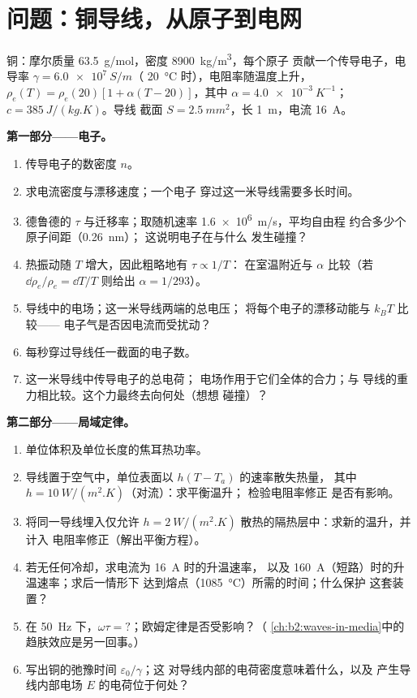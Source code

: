 \section{问题：铜导线，从原子到电网}

\begin{problem}
\label{pb:b2:charges-currents-conduction:1}

铜：摩尔质量 \qty{63.5}{g/mol}，密度 \qty{8900}{kg/m^3}，每个原子
贡献一个传导电子，电导率 $\gamma = \qty{6.0e7}{S/m}$（
\qty{20}{\degreeCelsius} 时），电阻率随温度上升，$\rho_e(T) = \rho_e(20)[1 +
\alpha(T - 20)]$，其中 $\alpha = \qty{4.0e-3}{K^{-1}}$；$c = \qty{385}{J/(kg.K)}$。导线
截面 $S = \qty{2.5}{mm^2}$，长 \qty{1}{m}，电流 \qty{16}{A}。

\medskip
\noindent\textbf{第一部分——电子。}
\begin{enumerate}
  \item 传导电子的数密度 $n$。
  \item 求电流密度与漂移速度；一个电子
        穿过这一米导线需要多长时间。
  \item 德鲁德的 $\tau$ 与迁移率；取随机速率 \qty{1.6e6}{m/s}，平均自由程
        约合多少个原子间距（\qty{0.26}{nm}）；
        这说明电子在与什么
        发生碰撞？
  \item 热振动随 $T$ 增大，因此粗略地有 $\tau \propto 1/T$：
        在室温附近与 $\alpha$ 比较（若 $\dd\rho_e/\rho_e =
        \dd T/T$ 则给出 $\alpha = 1/293$）。
  \item 导线中的电场；这一米导线两端的总电压；
        将每个电子的漂移动能与 $k_BT$ 比较——
        电子气是否因电流而受扰动？
  \item 每秒穿过导线任一截面的电子数。
  \item 这一米导线中传导电子的总电荷；
        电场作用于它们全体的合力；与
        导线的重力相比较。这个力最终去向何处（想想
        碰撞）？
\end{enumerate}

\medskip
\noindent\textbf{第二部分——局域定律。}
\begin{enumerate}[resume]
  \item 单位体积及单位长度的焦耳热功率。
  \item 导线置于空气中，单位表面以 $h(T - T_a)$ 的速率散失热量，
        其中 $h = \qty{10}{W/(m^2.K)}$（对流）：求平衡温升；
        检验电阻率修正
        是否有影响。
  \item 将同一导线埋入仅允许 $h =
        \qty{2}{W/(m^2.K)}$ 散热的隔热层中：求新的温升，并计入
        电阻率修正（解出平衡方程）。
  \item 若无任何冷却，求电流为 \qty{16}{A} 时的升温速率，
        以及 \qty{160}{A}（短路）时的升温速率；求后一情形下
        达到熔点（\qty{1085}{\degreeCelsius}）所需的时间；什么保护
        这套装置？
  \item 在 \qty{50}{Hz} 下，$\omega\tau = ?$；欧姆定律是否受影响？（
        \cref{ch:b2:waves-in-media}中的趋肤效应是另一回事。）
  \item 写出铜的弛豫时间 $\varepsilon_0/\gamma$；这
        对导线内部的电荷密度意味着什么，以及
        产生导线内部电场 $E$ 的电荷位于何处？
\end{enumerate}


\end{problem}
